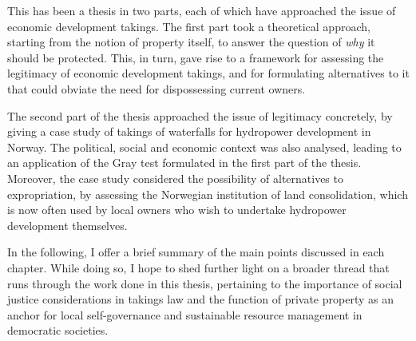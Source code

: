 This has been a thesis in two parts, each of which have approached the issue of economic development takings. The first part took a theoretical approach, starting from the notion of property itself, to answer the question of {\it why} it should be protected. This, in turn, gave rise to a framework for assessing the legitimacy of economic development takings, and for formulating alternatives to it that could obviate the need for dispossessing current owners.

The second part of the thesis approached the issue of legitimacy concretely, by giving a case study of takings of waterfalls for hydropower development in Norway. The political, social and economic context was also analysed, leading to an application of the Gray test formulated in the first part of the thesis. Moreover, the case study considered the possibility of alternatives to expropriation, by assessing the Norwegian institution of land consolidation, which is now often used by local owners who wish to undertake hydropower development themselves.




In the following, I offer a brief summary of the main points discussed in each chapter. While doing so, I hope to shed further light on a broader thread that runs through the work done in this thesis, pertaining to the importance of social justice considerations in takings law and the function of private property as an anchor for local self-governance and sustainable resource management in democratic societies.

